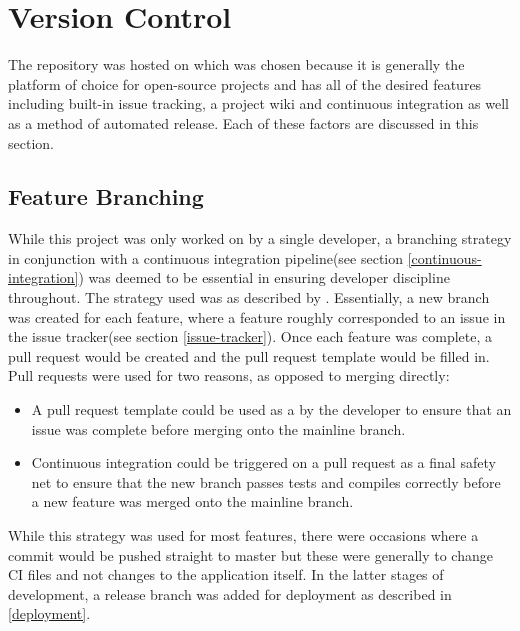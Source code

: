 \documentclass{l4proj}
\begin{document}
\section{Version Control}
The repository was hosted on \cite{GitHub:online} which was chosen because it is generally the platform of choice for open-source projects and has all of the desired features including built-in issue tracking, a project wiki and continuous integration as well as a method of automated release. Each of these factors are discussed in this section.


\subsection{Feature Branching}
While this project was only worked on by a single developer, a branching strategy in conjunction with a continuous integration pipeline(see section \ref{continuous-integration}) was deemed to be essential in ensuring developer discipline throughout. The strategy used was  as described by \cite{fowler_2020}. Essentially, a new branch was created for each feature, where a feature roughly corresponded to an issue in the issue tracker(see section \ref{issue-tracker}). Once each feature was complete, a pull request would be created and the pull request template would be filled in. Pull requests were used for two reasons, as opposed to merging directly: \begin{itemize}
    \item A pull request template could be used as a  by the developer to ensure that an issue was complete before merging onto the mainline branch.
    \item Continuous integration could be triggered on a pull request as a final safety net to ensure that the new branch passes tests and compiles correctly before a new feature was merged onto the mainline branch.
\end{itemize}
While this strategy was used for most features, there were occasions where a commit would be pushed straight to master but these were generally to change CI files and not changes to the application itself. In the latter stages of development, a release branch was added for deployment as described in \ref{deployment}.
\end{document}
